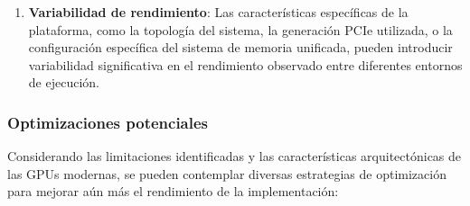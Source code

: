 \begin{enumerate}
                \item \textbf{Variabilidad de rendimiento}: Las características específicas de la plataforma, como la topología del sistema, la generación PCIe utilizada, o la configuración específica del sistema de memoria unificada, pueden introducir variabilidad significativa en el rendimiento observado entre diferentes entornos de ejecución.
                
            \end{enumerate}
    
        \subsubsection{Optimizaciones potenciales}
    
            Considerando las limitaciones identificadas y las características arquitectónicas de las GPUs modernas, se pueden contemplar diversas estrategias de optimización para mejorar aún más el rendimiento de la implementación:
    
